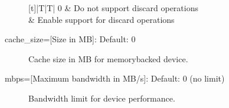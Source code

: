 \documentclass[a4paper,11pt,english]{sphinxmanual}
\begin{document}
\begin{description}
\begin{savenotes}
\begin{tabulary}{\linewidth}[t]{|T|T|}
0
&
Do not support discard operations
\\
&
Enable support for discard operations
\\
\hline
\end{tabulary}
\par
\sphinxattableend\end{savenotes}

\item[{cache\_size={[}Size in MB{]}: Default: 0}] \leavevmode
Cache size in MB for memory\sphinxhyphen{}backed device.

\item[{mbps={[}Maximum bandwidth in MB/s{]}: Default: 0 (no limit)}] \leavevmode
Bandwidth limit for device performance.

\end{description}
\end{document}
